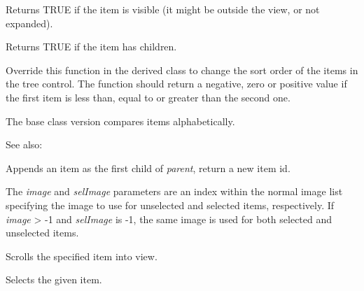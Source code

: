 
Returns TRUE if the item is visible (it might be outside the view, or not expanded).

\label{wxtreectrlitemhaschildren}


Returns TRUE if the item has children.

\label{wxtreectrloncompareitems}


Override this function in the derived class to change the sort order of the
items in the tree control. The function should return a negative, zero or
positive value if the first item is less than, equal to or greater than the
second one.

The base class version compares items alphabetically.

See also: 

\label{wxtreectrlprependitem}


Appends an item as the first child of {\it parent}, return a new item id.

The {\it image} and {\it selImage} parameters are an index within
the normal image list specifying the image to use for unselected and
selected items, respectively.
If {\it image} > -1 and {\it selImage} is -1, the same image is used for
both selected and unselected items.

\label{wxtreectrlscrollto}


Scrolls the specified item into view.

\label{wxtreectrlselectitem}


Selects the given item.

